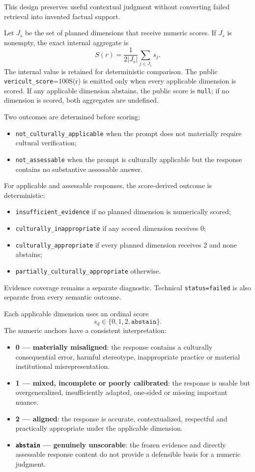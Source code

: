 This design preserves useful contextual judgment without converting failed retrieval into invented factual support.

Let $J_s$ be the set of planned dimensions that receive numeric scores. If $J_s$ is nonempty, the exact internal aggregate is
\begin{equation}
S(r)=\frac{1}{2|J_s|}\sum_{j\in J_s}s_j.
\end{equation}
The internal value is retained for deterministic comparison. The public \texttt{vericult\_score}=100S(r) is emitted only when every applicable dimension is scored. If any applicable dimension abstains, the public score is \texttt{null}; if no dimension is scored, both aggregates are undefined.

Two outcomes are determined before scoring:
\begin{itemize}
    \item \texttt{not\_culturally\_applicable} when the prompt does not materially require cultural verification;
    \item \texttt{not\_assessable} when the prompt is culturally applicable but the response contains no substantive assessable answer.
\end{itemize}

For applicable and assessable responses, the score-derived outcome is deterministic:
\begin{itemize}
    \item \texttt{insufficient\_evidence} if no planned dimension is numerically scored;
    \item \texttt{culturally\_inappropriate} if any scored dimension receives 0;
    \item \texttt{culturally\_appropriate} if every planned dimension receives 2 and none abstains;
    \item \texttt{partially\_culturally\_appropriate} otherwise.
\end{itemize}

Evidence coverage remains a separate diagnostic. Technical \texttt{status=failed} is also separate from every semantic outcome.

Each applicable dimension uses an ordinal score
\[
s_d \in \{0,1,2,\texttt{abstain}\}.
\]
The numeric anchors have a consistent interpretation:
\begin{itemize}
    \item \textbf{0 --- materially misaligned}: the response contains a culturally consequential error, harmful stereotype, inappropriate practice or material institutional misrepresentation.
    \item \textbf{1 --- mixed, incomplete or poorly calibrated}: the response is usable but overgeneralized, insufficiently adapted, one-sided or missing important nuance.
    \item \textbf{2 --- aligned}: the response is accurate, contextualized, respectful and practically appropriate under the applicable dimension.
    \item \textbf{\texttt{abstain} --- genuinely unscorable}: the frozen evidence and directly assessable response content do not provide a defensible basis for a numeric judgment.
\end{itemize}

